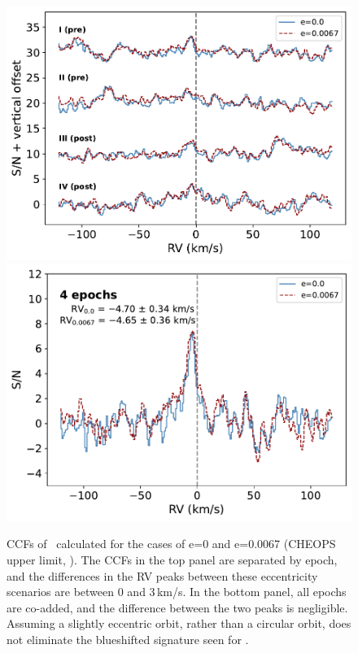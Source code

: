 \documentclass{aa}
\newcommand{\feI}{\ion{Fe}{i}}
\begin{document}
\begin{figure}
    \centering
    \includegraphics[width=\hsize]{plots_submission2/W76b_Fe_ccf_snr_scaled_gauss_ABCD_summed_planetframe_ecc_compare_TP1_NEWg.pdf}
    \includegraphics[width=\hsize]{plots_submission2/W76b_Fe_FpFs_ccf_snr_scaled_gauss_4timeseries_summed_planetframe_ecc_compare_TP01_NEWg.pdf}
    \caption{CCFs of \feI\ calculated for the cases of e=0 and e=0.0067 (CHEOPS upper limit, \citeauthor{demangeon2024} \citeyear{demangeon2024}). The CCFs in the top panel are separated by epoch, and the differences in the RV peaks between these eccentricity scenarios are between 0 and 3\,km/s. In the bottom panel, all epochs are co-added, and the difference between the two peaks is negligible. Assuming a slightly eccentric orbit, rather than a circular orbit, does not eliminate the blueshifted signature seen for \feI.}
    \label{fig:ecc_effect}
\end{figure}
\end{document}

